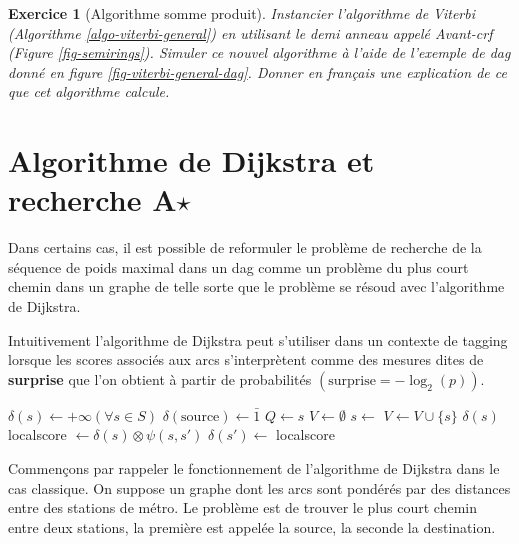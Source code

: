 \documentclass[11pt,openany]{book}
\newtheorem{exo}{Exercice}[chapter]
\newcommand{\ac}[1]{{\sc #1}} %
\newcommand{\kw}[1]{{\bf #1}} %
\begin{document}
\begin{exo}[Algorithme somme produit]
Instancier l'algorithme de Viterbi (Algorithme
\ref{algo-viterbi-general}) en utilisant le demi anneau 
appelé Avant-\ac{crf} (Figure \ref{fig-semirings}). Simuler ce nouvel
algorithme à l'aide de l'exemple  de \ac{dag} donné en figure
\ref{fig-viterbi-general-dag}. Donner en français une explication de
ce que cet algorithme calcule. 
\end{exo}


\section{Algorithme de Dijkstra et recherche A$\star$}
\label{sec-dijkstra}

Dans certains cas, il est possible de reformuler le problème de recherche de la séquence
de poids maximal dans un \ac{dag} comme un problème du plus court
chemin dans un graphe de telle sorte que le problème se résoud avec
l'algorithme de Dijkstra.
 
Intuitivement l'algorithme de Dijkstra peut s'utiliser dans un
contexte de tagging lorsque les scores associés aux arcs
s'interprètent comme des mesures dites de \kw{surprise} que l'on obtient à partir
de probabilités $(\text{surprise} =  -\log_2(p))$.


\begin{algorithm}[htbp]
\begin{algorithmic}
\State $ \delta(s) \gets +\infty$\qquad$(\forall s \in S)$ 
\State $ \delta(\text{source}) \gets \bar{1}$ 
\State $Q \gets s$
\State $V \gets \emptyset$
    \State $s \gets$  
    \State $V \gets V \cup \{s\}$
        \State\Return $\delta(s)$
    \EndIf
        \State localscore $\gets \delta(s) \otimes \psi(s,s')$
              \State $\delta(s') \gets$ localscore
              \State {}
        \EndIf
       \EndIf
    \EndFor
\EndWhile
\EndFunction
\end{algorithmic}
\caption{\label{algo-dijkstra-general}Algorithme de Dijkstra}
\end{algorithm}


Commençons par rappeler le fonctionnement de l'algorithme de Dijkstra
dans le cas classique. On suppose un graphe dont les arcs sont
pondérés par des distances entre des stations de métro. Le problème est de trouver le
plus court chemin entre deux stations, la première est appelée la
source, la seconde la destination.
\end{document}

